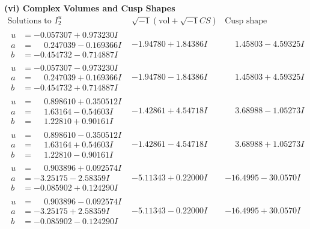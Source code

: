 \documentclass[1p]{elsarticle_modified}
\theoremstyle{definition}
\newcommand{\I}{\sqrt{-1}}
\begin{document}
\newpage\flushleft \textbf{(vi) Complex Volumes and Cusp Shapes}
$$\begin{array}{c|c|c}  
\text{Solutions to }I^u_{2}& \I (\text{vol} + \sqrt{-1}CS) & \text{Cusp shape}\\
 \hline 
\begin{aligned}
u &= -0.057307 + 0.973230 I \\
a &= \phantom{-}0.247039 - 0.169366 I \\
b &= -0.454732 - 0.714887 I\end{aligned}
 & -1.94780 + 1.84386 I & \phantom{-}1.45803 - 4.59325 I \\ \hline\begin{aligned}
u &= -0.057307 - 0.973230 I \\
a &= \phantom{-}0.247039 + 0.169366 I \\
b &= -0.454732 + 0.714887 I\end{aligned}
 & -1.94780 - 1.84386 I & \phantom{-}1.45803 + 4.59325 I \\ \hline\begin{aligned}
u &= \phantom{-}0.898610 + 0.350512 I \\
a &= \phantom{-}1.63164 - 0.54603 I \\
b &= \phantom{-}1.22810 + 0.90161 I\end{aligned}
 & -1.42861 + 4.54718 I & \phantom{-}3.68988 - 1.05273 I \\ \hline\begin{aligned}
u &= \phantom{-}0.898610 - 0.350512 I \\
a &= \phantom{-}1.63164 + 0.54603 I \\
b &= \phantom{-}1.22810 - 0.90161 I\end{aligned}
 & -1.42861 - 4.54718 I & \phantom{-}3.68988 + 1.05273 I \\ \hline\begin{aligned}
u &= \phantom{-}0.903896 + 0.092574 I \\
a &= -3.25175 - 2.58359 I \\
b &= -0.085902 + 0.124290 I\end{aligned}
 & -5.11343 + 0.22000 I & -16.4995 - 30.0570 I \\ \hline\begin{aligned}
u &= \phantom{-}0.903896 - 0.092574 I \\
a &= -3.25175 + 2.58359 I \\
b &= -0.085902 - 0.124290 I\end{aligned}
 & -5.11343 - 0.22000 I & -16.4995 + 30.0570 I \\ \hline\begin{aligned}

\end{aligned}
\end{array}$$
\end{document}
